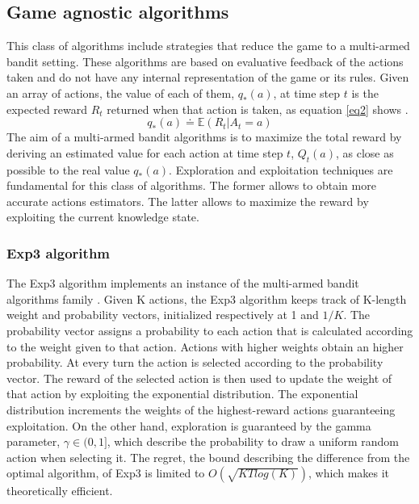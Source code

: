 \documentclass[runningheads]{llncs}
\begin{document}
\subsection{Game agnostic algorithms}
This class of algorithms include strategies that reduce the game
to a multi-armed bandit setting. These algorithms are based on
evaluative feedback of the actions taken and do not have any internal
representation of the game or its rules. Given an array
of actions, the value of each of them, $q_*(a)$, at time step $t$ is the expected
reward $R_t$ returned when that action is taken, as equation \ref{eq2}
shows \cite{rlbook}.
\begin{equation}\label{eq2}
  q_*(a) \doteq \mathbb{E}(R_t | A_t = a)
\end{equation}
The aim of a multi-armed bandit algorithms is to maximize the total reward
by deriving an estimated value for each action at time step
$t$, $Q_t(a)$, as close as possible to the real value
$q_*(a)$. Exploration and exploitation techniques are fundamental for
this class of algorithms. The former allows to obtain more accurate
actions estimators. The latter allows to maximize the reward by
exploiting the current knowledge state.

\subsubsection{Exp3 algorithm}
The Exp3 algorithm implements an instance of the multi-armed bandit
algorithms family \cite{exp3}. Given K actions, the Exp3 algorithm keeps track of
K-length weight and probability vectors, initialized respectively at 1
and $1/K$. The probability vector assigns a probability to each action
that is calculated according to the weight given to that
action. Actions with higher weights obtain an higher probability. At
every turn the action is selected according to the probability
vector. The reward of the selected action is then used to update the
weight of that action by exploiting the exponential distribution. The
exponential distribution increments the weights of the highest-reward
actions guaranteeing exploitation. On the other hand, exploration is
guaranteed by the gamma parameter, $\gamma \in (0, 1]$, which describe the probability to
draw a uniform random action when selecting it. The regret, the bound
describing the difference from the optimal algorithm, of Exp3 is
limited to $O(\sqrt{KTlog(K)})$, which makes it theoretically
efficient.
\end{document}
